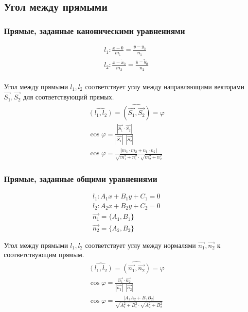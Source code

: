 \subsection{Угол между прямыми}

\subsubsection{Прямые, заданные каноническими уравнениями}

\begin{gather*}
  l_1: \frac{x - 0}{m_1} = \frac{y - y_0}{n_1} \\
  l_2: \frac{x - \widetilde{x}_0}{m_2} = \frac{y - \widetilde{y}_0}{n_2} \\
\end{gather*}

Угол между прямыми $l_1, l_2$ соответствует углу между направляющими векторами $\vec{S_1}, \vec{S_2}$ для соответствующий прямых.
\begin{gather*}
  \widehat{(l_1, l_2)} = \widehat{(\vec{S_1}, \vec{S_2})} = \varphi \\
  \cos \varphi = \frac{|\vec{S_1} \cdot \vec{S_2}|}{|\vec{S_1}| \cdot |\vec{S_2}|} \\
  \boxed{\cos \varphi = \frac{|m_1 \cdot m_2 + n_1 \cdot n_2|}{\sqrt{m_1^2 + n_1^2} \cdot \sqrt{m_2^2 + n_2^2}}}
\end{gather*}

\subsubsection{Прямые, заданные общими уравнениями}
\begin{gather*}
  l_1: A_1 x + B_1 y + C_1 = 0 \\
  l_2: A_2 x + B_2 y + C_2 = 0 \\
  \vec{n_1} = \{A_1, B_1\} \\
  \vec{n_2} = \{A_2, B_2\} 
\end{gather*}

Угол между прямыми $l_1, l_2$ соответствует углу между нормалями $\vec{n_1}, \vec{n_2}$ к соответствующим прямым.
\begin{gather*}
  \widehat{(l_1, l_2)} = \widehat{(\vec{n_1}, \vec{n_2})} = \varphi \\
  \cos \varphi = \frac{\vec{n_1} \cdot \vec{n_2}}{|\vec{n_1}| \cdot |\vec{n_2}| } \\
  \boxed{ \cos \varphi = \frac{|A_1 A_2 + B_1 B_2| }{ \sqrt{A_1^2 + B_1^2} \cdot \sqrt{A_2^2 + B_2^2}} }
\end{gather*}



